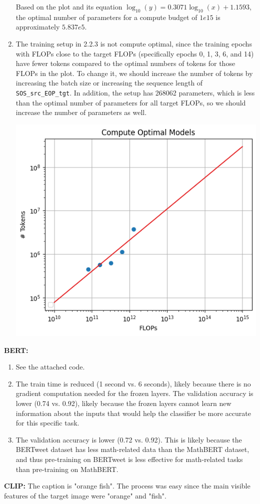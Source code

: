 \documentclass[12pt]{article}
\begin{document}
\begin{enumerate}
\begin{center}
    \end{center} Based on the plot and its equation $\log_{10}(y) = 0.3071\log_{10}(x) + 1.1593$, the optimal number of parameters for a compute budget of $1e15$ is approximately $5.837e5$.
    \item The training setup in 2.2.3 is not compute optimal, since the training epochs with FLOPs close to the target FLOPs (specifically epochs 0, 1, 3, 6, and 14) have fewer tokens compared to the optimal numbers of tokens for those FLOPs in the plot. To change it, we should increase the number of tokens by increasing the batch size or increasing the sequence length of \texttt{SOS\_src\_EOP\_tgt}. In addition, the setup has 268062 parameters, which is less than the optimal number of parameters for all target FLOPs, so we should increase the number of parameters as well.
    \begin{center}
        \includegraphics[scale=.6]{2.3.4.png}
    \end{center}
\end{enumerate}

\textbf{BERT:}
\begin{enumerate}
    \item See the attached code.
    \addtocounter{enumi}{1}
    \item The train time is reduced (1 second vs. 6 seconds), likely because there is no gradient computation needed for the frozen layers. The validation accuracy is lower (0.74 vs. 0.92), likely because the frozen layers cannot learn new information about the inputs that would help the classifier be more accurate for this specific task.
    \item The validation accuracy is lower (0.72 vs. 0.92). This is likely because the BERTweet dataset has less math-related data than the MathBERT dataset, and thus pre-training on BERTweet is less effective for math-related tasks than pre-training on MathBERT.
\end{enumerate}

\textbf{CLIP:} The caption is "orange fish". The process was easy since the main visible features of the target image were "orange" and "fish".
\end{document}
